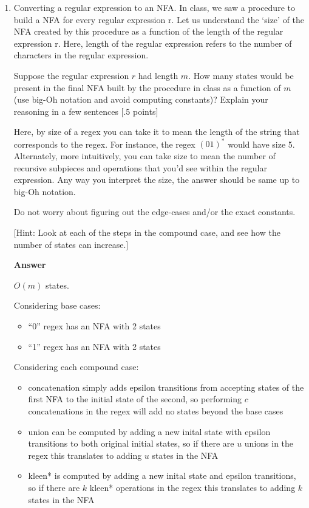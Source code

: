 \documentclass[11pt]{article}
\newcommand \kw[1]{\textbf{#1}}
\newenvironment{answer}{
\vspace{.5cm}
\begin{mdframed}[]
    \kw{Answer} 
}
{
\end{mdframed}
\pagebreak
}
\begin{document}
\begin{enumerate}
\begin{answer}
\end{answer}


\item Converting a regular expression to an NFA. In class, we saw a procedure to build a NFA for every regular expression r. Let us understand the `size' of the NFA created by this procedure as a function of the length of the regular expression r. Here, length of the regular expression refers to the number of characters in the regular expression. 

Suppose the regular expression $r$ had length $m$. How many states would be present in the final NFA built by the procedure in class as a function of $m$ (use big-Oh notation and avoid computing constants)? Explain your reasoning in a few sentences [.5 points]

Here, by size of a regex you can take it to mean the length of the string that corresponds to the regex. For instance, the regex $(01)^*$ would have size 5. Alternately, more intuitively, you can take size to mean the number of recursive subpieces and operations that you'd see within the regular expression. Any way you interpret the size, the answer should be same up to big-Oh notation. 

Do not worry about figuring out the edge-cases and/or the exact constants.

[Hint: Look at each of the steps in the compound case, and see how the number of states can increase.]

\begin{answer}
    $O(m)$ states.

    \vspace{.5cm}

    Considering base cases:
    \begin{itemize}
        \item ``0'' regex has an NFA with 2 states
        \item ``1'' regex has an NFA with 2 states
    \end{itemize}

    Considering each compound case:
    \begin{itemize}
        \item concatenation simply adds epsilon transitions from accepting states of the first NFA to the initial state of the second, so performing $c$ concatenations in the regex will add no states beyond the base cases 
        \item union can be computed by adding a new inital state with epsilon transitions to both original initial states, so if there are $u$ unions in the regex this translates to adding $u$ states in the NFA
        \item kleen* is computed by adding a new inital state and epsilon transitions, so if there are $k$ kleen* operations in the regex this translates to adding $k$ states in the NFA
    \end{itemize} 


\end{answer}
\end{enumerate}
\end{document}
